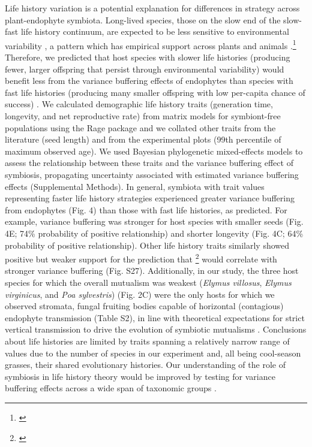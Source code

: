\documentclass[12pt]{article}
\newcommand{\tom}[2]{{\color{red}{#1}}\footnote{\textit{\color{red}{#2}}}}
\begin{document}
Life history variation is a potential explanation for differences in strategy across plant-endophyte symbiota.
Long-lived species, those on the slow end of the slow-fast life history continuum, are expected to be less sensitive to environmental variability \cite{murphy1968pattern}, a pattern which has empirical support across plants \cite{compagnoni2021herbaceous} and animals \cite{le2022life}.\tom{}{add Morris reference here?} 
Therefore, we predicted that host species with slower life histories (producing fewer, larger offspring that persist through environmental variability) would benefit less from the variance buffering effects of endophytes than species with fast life histories (producing many smaller offspring with low per-capita chance of success) \cite{rees1996evolutionary,moles2004seedling}.
We calculated demographic life history traits (generation time, longevity, and net reproductive rate) from matrix models for symbiont-free populations using the Rage package \cite{jones2022rcompadre} and we collated other traits from the literature (seed length) and from the experimental plots (99th percentile of maximum observed age). 
We used Bayesian phylogenetic mixed-effects models to assess the relationship between these traits and the variance buffering effect of symbiosis, propagating uncertainty associated with estimated variance buffering effects (Supplemental Methods).
In general, symbiota with trait values representing faster life history strategies experienced greater variance buffering from endophytes (Fig. 4) than those with fast life histories, as predicted. 
For example, variance buffering was stronger for host species with smaller seeds (Fig. 4E; 74\% probability of positive relationship) and shorter longevity (Fig. 4C; 64\% probability of positive relationship).
Other life history traits similarly showed positive but weaker support for the prediction that \tom{slower life traits}{I don't think R0 is a slow life history trait.} would correlate with stronger variance buffering (Fig. S27).
Additionally, in our study, the three host species for which the overall mutualism was weakest (\emph{Elymus villosus}, \emph{Elymus virginicus}, and \emph{Poa sylvestris}) (Fig. 2C) were the only hosts for which we observed stromata, fungal fruiting bodies capable of horizontal (contagious) endophyte transmission (Table S2), in line with theoretical expectations for strict vertical transmission to drive the evolution of symbiotic mutualisms \cite{fine1975vectors,afkhami2008symbiosis}.
Conclusions about life histories are limited by traits spanning a relatively narrow range of values due to the number of species in our experiment and, all being cool-season grasses, their shared evolutionary histories. 
Our understanding of the role of symbiosis in life history theory would be improved by testing for variance buffering effects across a wide span of taxonomic groups \cite{jeschke2009roles}.
\end{document}
